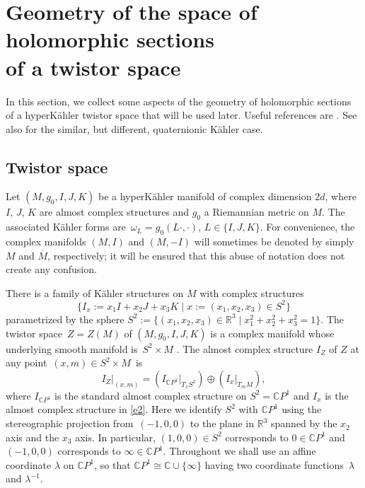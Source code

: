 \documentclass[pdftex]{sigma}
\numberwithin{equation}{section}
\theoremstyle{definition}
\newcommand\C{{\mathbb C}}
\begin{document}
\section[Geometry of the space of holomorphic sections of a twistor space]{Geometry of the space of holomorphic sections\\ of a twistor space}\label{sectionaboutsections}

In this section, we collect some aspects of the geometry of holomorphic sections of a hyperK\"ahler twistor space
that will be used later. Useful references are \cite{HKLR,JV2,JV1}. See also \cite{LeBrun} for
the similar, but different, quaternionic K\"ahler case.

\subsection{Twistor space}\label{ss:twistor}

Let $(M, g_0, I, J, K)$ be a hyperK\"ahler manifold of complex dimension $2d$,
where $I$, $J$, $K$ are almost complex structures and $g_0$ a Riemannian metric on $M$.
The associated K\"ahler forms are~${\omega_L = g_0(L\cdot, \cdot)}$, $ L \in \{I, J, K\}$.
For convenience, the complex manifolds $(M, I)$ and
$(M, -I)$ will sometimes be denoted by simply $M$ and $\overline{M}$, respectively; it will
be ensured that this abuse of notation does not create any confusion.

There is a family of K\"ahler structures on $M$ with complex structures
\begin{equation}\label{e2}
\bigl\{I_x := x_1I + x_2J+x_3K \mid x := (x_1, x_2, x_3) \in S^2 \bigr\}
\end{equation}
parametrized by the sphere
$S^2 := \bigl\{(x_1, x_2, x_3) \in {\mathbb R}^3 \mid x^2_1+x^2_2+x^2_3 = 1\bigr\}$.
The twistor space~${Z = Z(M)}$ of $(M, g_0, I, J, K)$ is a complex manifold whose underlying smooth
manifold is~${S^2\times M}$ \cite[Section~3\,(F)]{HKLR}.
The almost complex structure $I_Z$ of $Z$ at any point~$(x, m) \in S^2\times M$~is
\[I_Z|_{(x,m)} = (I_{\mathbb CP^1}\vert_{T_x S^2}) \oplus (I_x\vert_{T_mM}) ,\]
 where
$I_{\mathbb CP^1}$ is the standard almost complex structure on $S^2 = \C P^1$ and $I_x$
is the almost complex structure in \eqref{e2}. Here
we identify $S^2$ with $\C P^1$ using the stereographic projection from~${(-1, 0, 0)}$ to the plane in
${\mathbb R}^3$ spanned by the $x_2$ axis and the $x_3$ axis.
In particular, $(1, 0, 0) \in S^2$ corresponds to $0 \in \C P^1$ and $(-1, 0, 0)$ corresponds to
$\infty \in \C P^1$.
Throughout we shall use an affine coordinate $\lambda$ on $\C P^1$, so that $\C P^1 \cong \C\cup\{\infty\}$
having two coordinate functions~$\lambda$ and $\lambda^{-1}$.
\end{document}
